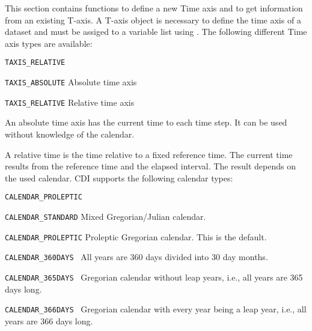 This section contains functions to define a new Time axis
and to get information from an existing T-axis.
A T-axis  object is necessary to define the time axis of a dataset
and must be assiged to a variable list using .
The following different Time axis types are available:

\vspace*{3mm}
\hspace*{8mm}\begin{minipage}{15cm}
\begin{deflist}{{\large\tt TAXIS\_RELATIVE \ \ }}
\item[{\large\tt TAXIS\_ABSOLUTE}]  Absolute time axis    
\item[{\large\tt TAXIS\_RELATIVE}]  Relative time axis
\end{deflist}
\end{minipage}
\vspace*{3mm}

An absolute time axis has the current time to each time step.
It can be used without knowledge of the calendar.

A relative time is the time relative to a fixed reference time.
The current time results from the reference time and the elapsed interval.
The result depends on the used calendar.
CDI supports the following calendar types:

\vspace*{3mm}
\hspace*{8mm}\begin{minipage}{15cm}
\begin{deflist}{{\large\tt CALENDAR\_PROLEPTIC \ \ }}
\item[{\large\tt CALENDAR\_STANDARD}]  Mixed Gregorian/Julian calendar.
\item[{\large\tt CALENDAR\_PROLEPTIC}]  Proleptic Gregorian calendar. This is the default.
\item[{\large\tt CALENDAR\_360DAYS }]  All years are 360 days divided into 30 day months.
\item[{\large\tt CALENDAR\_365DAYS }]  Gregorian calendar without leap years, i.e., all years are 365 days long.
\item[{\large\tt CALENDAR\_366DAYS }]  Gregorian calendar with every year being a leap year, i.e., all years are 366 days long.
\end{deflist}
\end{minipage}

